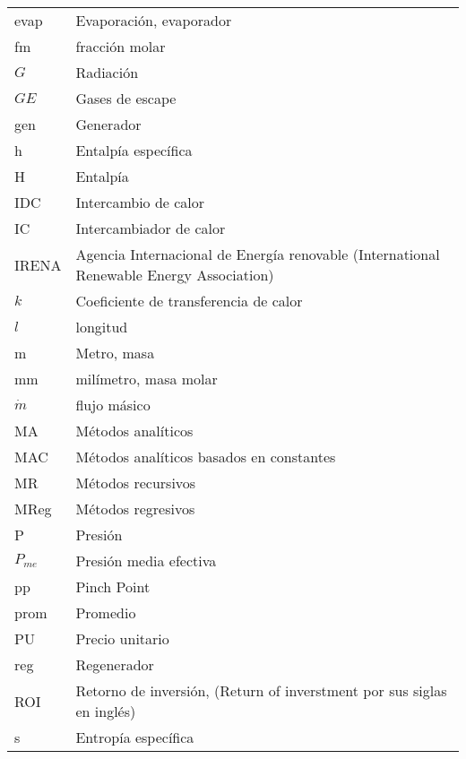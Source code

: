 \begin{longtable}[H]{p{3.5cm}p{12cm}}
        evap                  & Evaporación, evaporador \\
        fm                    & fracción molar \\
        $G$                   & Radiación \\
        $GE$                  & Gases de escape \\
        gen                   & Generador \\
        h                     & Entalpía específica \\
        H                     & Entalpía \\
        IDC                   & Intercambio de calor \\
        IC                    & Intercambiador de calor \\
        IRENA                 & Agencia Internacional de Energía renovable (International Renewable Energy Association) \\
        $k$                   & Coeficiente de transferencia de calor \\
        $l$                   & longitud \\
        m                     & Metro, masa \\
        mm                    & milímetro, masa molar \\
        $\dot{m}$             & flujo másico \\
        MA                    & Métodos analíticos \\
        MAC                   & Métodos analíticos basados en constantes \\
        MR                    & Métodos recursivos \\
        MReg                  & Métodos regresivos \\
        P                     & Presión \\
        $P_{me}$              & Presión media efectiva \\
        pp                    & Pinch Point \\
        prom                  & Promedio \\
        PU                    & Precio unitario \\
        reg                   & Regenerador \\
        ROI                   & Retorno de inversión, (Return of inverstment por sus siglas en inglés)\\
        s                     & Entropía específica \\

\end{longtable}

